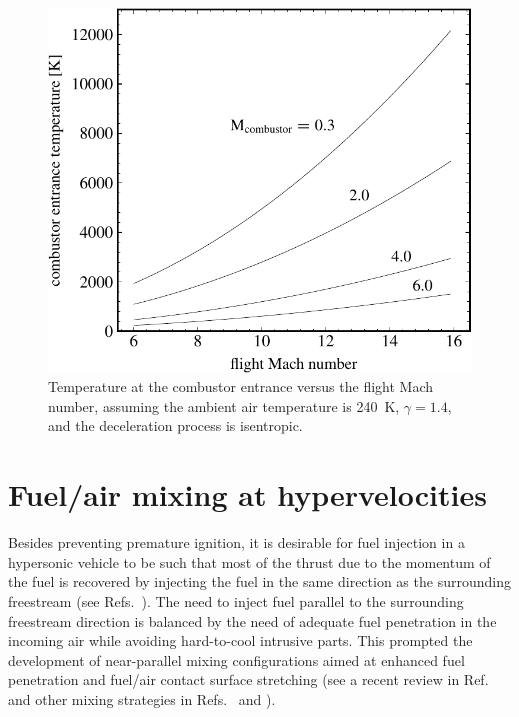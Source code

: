 %
\begin{figure}
   \includegraphics[width=3.8\lengthfigure]{fig1/combustor_entrance.pdf}
   \caption{Temperature at the combustor entrance versus the flight Mach
            number, assuming the ambient air temperature is 240~K, $\gamma=1.4$,
            and the deceleration process is isentropic.}
   \label{fig:combustor_entrance}
\end{figure}
%


\section{Fuel/air mixing at hypervelocities}



Besides preventing premature ignition, it is desirable for
fuel injection in a hypersonic vehicle to be such that
most of the thrust due to the momentum
of the fuel is recovered by injecting the fuel in the same
direction as the surrounding freestream
(see Refs.~\cite{aiaa:1966:rubins,misc:1970:townend,
nasa:1978:morrison,nasa:1980:morrison}).
The need to inject fuel parallel to the surrounding freestream
direction is balanced by the need of adequate
fuel penetration in the incoming air while avoiding hard-to-cool intrusive parts.
This prompted the development of near-parallel
mixing configurations aimed at enhanced fuel penetration
and fuel/air contact surface stretching (see a recent review in
Ref.~\cite{misc:1995:gutmark} and other mixing strategies in
Refs.~\cite{jpp:1995:bushnell} and \cite{jpp:1994:bogdanoff}).


